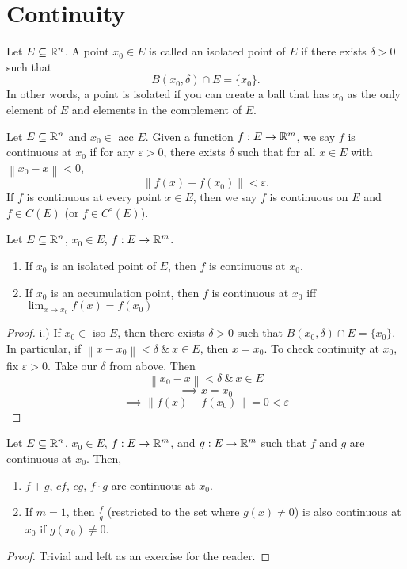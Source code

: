 \documentclass[11pt]{article}
\newcommand{\norm}[1]{\left\lVert #1 \right\rVert}
\newcommand{\ra}{\rightarrow}
\begin{document}
\section{Continuity}
\begin{definition}
    Let $E \subseteq \mathbb{R}^n$. A point $x_0 \in E$ is called an isolated point of $E$ if there exists $\delta >0$ such that 
    \[B(x_0,\delta) \cap E = \{x_0\}.\]
    In other words, a point is isolated if you can create a ball that has $x_0$ as the only element of $E$ and elements in the complement of $E$.
\end{definition}
\begin{definition}
    Let $E \subseteq \mathbb{R}^n$ and $x_0 \in$ acc $E$. Given a function $f: E \ra \R^m$, we say $f$ is continuous at $x_0$ if for any $\varepsilon > 0$, there exists $\delta$ such that for all $x \in E$ with $\norm{x_0 - x} < 0$, 
    \[\norm{f(x) - f(x_0)} < \varepsilon.\]
    If $f$ is continuous at every point $x \in E$, then we say $f$ is continuous on $E$ and $f \in C(E)$ (or $f \in C^\circ(E)$). 
\end{definition}

\begin{theorem}
    Let $E \subseteq \mathbb{R}^n$, $x_0 \in E$, $f: E \ra \R^m$. 
    \begin{enumerate} [label = \roman*.)]
        \item If $x_0$ is an isolated point of $E$, then $f$ is continuous at $x_0$. 
        \item If $x_0$ is an accumulation point, then $f$ is continuous at $x_0$ iff $\displaystyle{\lim_{x \ra x_0} f(x) = f(x_0)}$
    \end{enumerate}
    \begin{proof}
        i.) If $x_0 \in$ iso $E$, then there exists $\delta > 0$ such that $B(x_0, \delta) \cap E = \{x_0\}$. In particular, if $\norm{x - x_0} < \delta \ \& \ x \in E$, then $x = x_0$. To check continuity at $x_0$, fix $\varepsilon > 0$. Take our $\delta$ from above. Then \[\norm{x_0 - x} < \delta \ \& \ x \in E\]
        \[\implies x = x_0\]
        \[\implies \norm{f(x) - f(x_0)} = 0 < \varepsilon\]
    \end{proof}
\end{theorem}

\begin{theorem}
    Let $E \subseteq \mathbb{R}^n$, $x_0 \in E$, $f: E \ra \R^m$, and $g: E \ra \R^m$ such that $f$ and $g$ are continuous at $x_0$. Then,
    \begin{enumerate} [label = \roman*.)]
        \item $f + g$, $cf$, $cg$, $f \cdot g$ are continuous at $x_0$. 
        \item If $m = 1$, then $\frac{f}{g}$ (restricted to the set where $g(x) \neq 0$) is also continuous at $x_0$ if $g(x_0) \neq 0$. 
    \end{enumerate}
    \begin{proof}
        Trivial and left as an exercise for the reader. 
    \end{proof}
\end{theorem}
\end{document}
